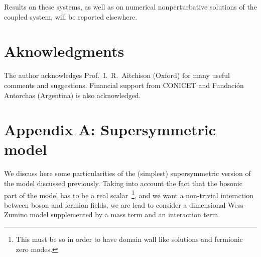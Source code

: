 \documentclass[a4paper,12pt]{article}
\begin{document}
Results on these systems, as well as on numerical nonperturbative 
solutions of the coupled system, will be reported elsewhere.
 
%
\section*{Aknowledgments}
The author acknowledges Prof.~I.~R.~Aitchison (Oxford) for many useful 
comments and suggestions.
Financial support from CONICET and Fundaci{\'o}n Antorchas (Argentina) is
also acknowledged.
%
\section*{Appendix A: Supersymmetric model}
We discuss here some particularities of the (simplest) supersymmetric 
version of the model discussed previously. Taking into account the 
fact that the bosonic part of the model has to be a real 
scalar~\footnote{This must be so in order to have domain wall like
solutions and fermionic zero modes.}, and we want a non-trivial 
interaction between boson and fermion fields, we are lead to consider 
a \mbox{\coordHE{}} dimensional Wess-Zumino model 
supplemented by a mass term and an interaction term. 
\end{document}
